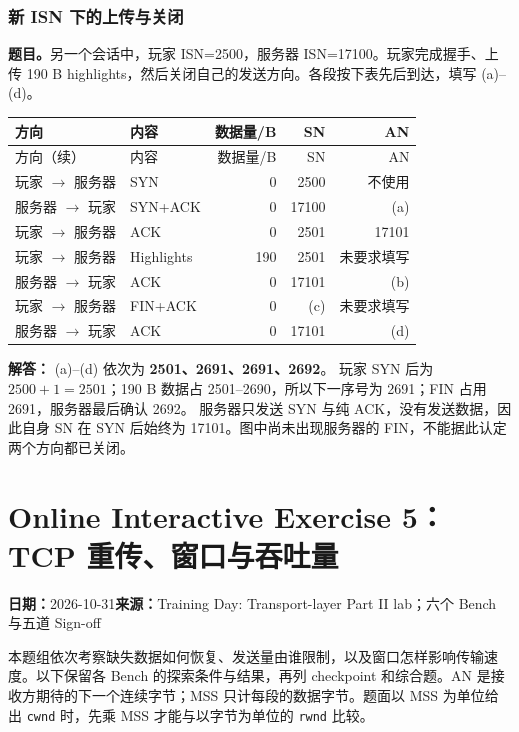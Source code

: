 \documentclass[11pt,a4paper,fontset=fandol]{ctexart}
\renewcommand{\exercisequestion}[2]{%
  \Needspace{5\baselineskip}%
  \subsubsection{#2}\label{exercise:#1}%
}
\renewcommand{\exercisemeta}[5]{%
  {\small\textbf{日期：}#2\quad\textbf{来源：}#3\par}%
}
\renewenvironment{checkedsolution}
  {\par\nopagebreak[4]\textbf{解答：}\ignorespaces}
  {\par}
\begin{document}
\exercisequestion{SC2008-HW04-Q15}{新 ISN 下的上传与关闭}
\textbf{题目。}另一个会话中，玩家 ISN=2500，服务器 ISN=17100。玩家完成握手、上传 190 B highlights，然后关闭自己的发送方向。各段按下表先后到达，填写 (a)--(d)。
\begingroup
\small
\setlength{\LTpre}{0.25em}
\setlength{\LTpost}{0.25em}
\begin{longtable}{@{}llrrr@{}}
\toprule
方向 & 内容 & 数据量/B & SN & AN \\
\midrule
\endfirsthead
\toprule
方向（续） & 内容 & 数据量/B & SN & AN \\
\midrule
\endhead
\bottomrule
\endfoot
玩家 $\to$ 服务器 & SYN & 0 & 2500 & 不使用 \\
服务器 $\to$ 玩家 & SYN+ACK & 0 & 17100 & (a) \\
玩家 $\to$ 服务器 & ACK & 0 & 2501 & 17101 \\
玩家 $\to$ 服务器 & Highlights & 190 & 2501 & 未要求填写 \\
服务器 $\to$ 玩家 & ACK & 0 & 17101 & (b) \\
玩家 $\to$ 服务器 & FIN+ACK & 0 & (c) & 未要求填写 \\
服务器 $\to$ 玩家 & ACK & 0 & 17101 & (d) \\
\end{longtable}
\endgroup
\begin{checkedsolution}
(a)--(d) 依次为 \textbf{2501、2691、2691、2692}。
玩家 SYN 后为 $2500+1=2501$；190 B 数据占 2501--2690，所以下一序号为 2691；FIN 占用 2691，服务器最后确认 2692。
服务器只发送 SYN 与纯 ACK，没有发送数据，因此自身 SN 在 SYN 后始终为 17101。图中尚未出现服务器的 FIN，不能据此认定两个方向都已关闭。
\end{checkedsolution}

\section{Online Interactive Exercise 5：TCP 重传、窗口与吞吐量}
\label{homework:SC2008-HW05}
\exercisemeta
  {SC2008-HW05}
  {2026-10-31}
  {Training Day: Transport-layer Part II lab；六个 Bench 与五道 Sign-off}
  {已完成；依据题面、反馈与计算核对}
  {已确认完成}

本题组依次考察缺失数据如何恢复、发送量由谁限制，以及窗口怎样影响传输速度。以下保留各 Bench 的探索条件与结果，再列 checkpoint 和综合题。AN 是接收方期待的下一个连续字节；MSS 只计每段的数据字节。题面以 MSS 为单位给出 \texttt{cwnd} 时，先乘 MSS 才能与以字节为单位的 \texttt{rwnd} 比较。
\end{document}
